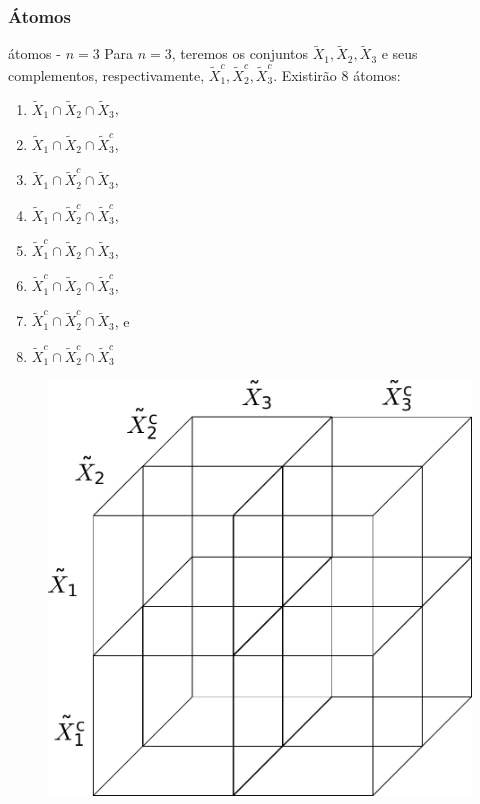 \begin{frame}%
  \frametitle{Átomos}
  \begin{exampleblock}{átomos - $n=3$}
  Para $n=3$, teremos os conjuntos $\tilde{X}_1, \tilde{X}_2, \tilde{X}_3$ e seus complementos,  
  respectivamente, $\tilde{X}_1^c, \tilde{X}_2^c, \tilde{X}_3^c$. Existirão $8$ átomos:

  \begin{minipage}[t]{0.35\linewidth}
  \begin{enumerate}
  \item $\tilde{X}_1 \cap \tilde{X}_2 \cap \tilde{X}_3$,
  \item $\tilde{X}_1 \cap \tilde{X}_2 \cap \tilde{X}_3^c$,
  \item $\tilde{X}_1 \cap \tilde{X}_2^c \cap \tilde{X}_3$,
  \item $\tilde{X}_1 \cap \tilde{X}_2^c \cap \tilde{X}_3^c$,
  \item $\tilde{X}_1^c \cap \tilde{X}_2 \cap \tilde{X}_3$, 
  \item $\tilde{X}_1^c \cap \tilde{X}_2 \cap \tilde{X}_3^c$,
  \item $\tilde{X}_1^c \cap \tilde{X}_2^c \cap \tilde{X}_3$, e 
  \item $\tilde{X}_1^c \cap \tilde{X}_2^c \cap \tilde{X}_3^c$
  \end{enumerate}
  \end{minipage} \hfill
  \begin{minipage}[t]{0.6\linewidth}
    \begin{figure}[!ht]
    \includegraphics[width=0.6\linewidth]{images/atoms-n3.pdf}
    \end{figure}
  \end{minipage}

  \end{exampleblock}
\end{frame}

